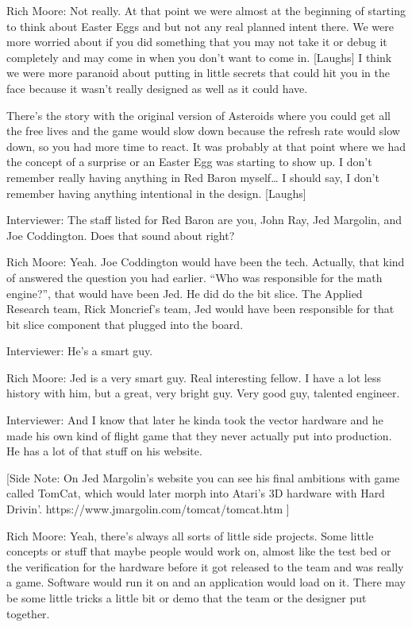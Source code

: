 \textcolor{interviewee}{Rich Moore:} Not really. At that point we were almost at the beginning of starting to think about Easter Eggs and but not any real planned intent there. We were more worried about if you did something that you may not take it or debug it completely and may come in when you don't want to come in. [Laughs] I think we were more paranoid about putting in little secrets that could hit you in the face because it wasn't really designed as well as it could have.

There’s the story with the original version of Asteroids where you could get all the free lives and the game would slow down because the refresh rate would slow down, so you had more time to react. It was probably at that point where we had the concept of a surprise or an Easter Egg was starting to show up. I don't remember really having anything in Red Baron myself… I should say, I don't remember having anything intentional in the design. [Laughs]

\textcolor{interviewer}{Interviewer:} The staff listed for Red Baron are you, John Ray, Jed Margolin, and Joe Coddington. Does that sound about right?

\textcolor{interviewee}{Rich Moore:} Yeah. Joe Coddington would have been the tech. Actually, that kind of answered the question you had earlier. “Who was responsible for the math engine?”, that would have been Jed. He did do the bit slice. The Applied Research team, Rick Moncrief’s team, Jed would have been responsible for that bit slice component that plugged into the board.

\textcolor{interviewer}{Interviewer:} He's a smart guy.

\textcolor{interviewee}{Rich Moore:} Jed is a very smart guy. Real interesting fellow. I have a lot less history with him, but a great, very bright guy. Very good guy, talented engineer.

\textcolor{interviewer}{Interviewer:} And I know that later he kinda took the vector hardware and he made his own kind of flight game that they never actually put into production. He has a lot of that stuff on his website.

[Side Note: On Jed Margolin’s website you can see his final ambitions with game called TomCat, which would later morph into Atari’s 3D hardware with Hard Drivin’. https://www.jmargolin.com/tomcat/tomcat.htm ]

\textcolor{interviewee}{Rich Moore:} Yeah, there's always all sorts of little side projects. Some little concepts or stuff that maybe people would work on, almost like the test bed or the verification for the hardware before it got released to the team and was really a game. Software would run it on and an application would load on it. There may be some little tricks a little bit or demo that the team or the designer put together.

